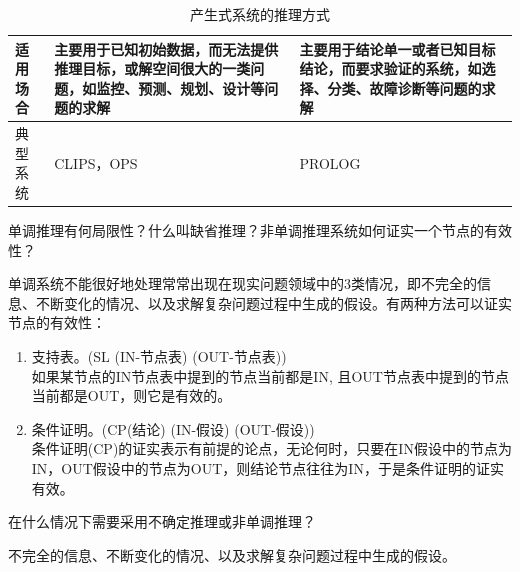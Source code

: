 \begin{solution}
\begin{table}[htbp]
\begin{tabular}{p{80pt}p{110pt}p{110pt}}
		\midrule
		适用场合 & 主要用于已知初始数据，而无法提供推理目标，或解空间很大的一类问题，如监控、预测、规划、设计等问题的求解 & 主要用于结论单一或者已知目标结论，而要求验证的系统，如选择、分类、故障诊断等问题的求解 \\ 
		\midrule
		典型系统 & CLIPS，OPS & PROLOG \\
		\bottomrule
	\end{tabular}
	\caption{产生式系统的推理方式}\label{tab:reasoning-of-production-system}
	\end{table}
\end{solution}

\begin{question}
单调推理有何局限性？什么叫缺省推理？非单调推理系统如何证实一个节点的有效性？
\end{question}
\begin{solution}
单调系统不能很好地处理常常出现在现实问题领域中的3类情况，即不完全的信息、不断变化的情况、以及求解复杂问题过程中生成的假设。有两种方法可以证实节点的有效性：
	\begin{enumerate}
		\item 支持表。(SL (IN-节点表) (OUT-节点表)) \\
			如果某节点的IN节点表中提到的节点当前都是IN, 且OUT节点表中提到的节点当前都是OUT，则它是有效的。
		\item 条件证明。(CP(结论) (IN-假设) (OUT-假设)) \\
			条件证明(CP)的证实表示有前提的论点，无论何时，只要在IN假设中的节点为IN，OUT假设中的节点为OUT，则结论节点往往为IN，于是条件证明的证实有效。 
	\end{enumerate}
\end{solution}

\begin{question}
在什么情况下需要采用不确定推理或非单调推理？
\end{question}
\begin{solution}
不完全的信息、不断变化的情况、以及求解复杂问题过程中生成的假设。
\end{solution}

